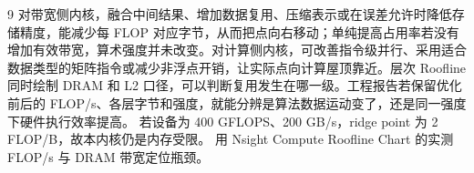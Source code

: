 \begin{solutionexercise}{9}
对带宽侧内核，融合中间结果、增加数据复用、压缩表示或在误差允许时降低存储精度，能减少每 FLOP 对应字节，从而把点向右移动；单纯提高占用率若没有增加有效带宽，算术强度并未改变。对计算侧内核，可改善指令级并行、采用适合数据类型的矩阵指令或减少非浮点开销，让实际点向计算屋顶靠近。层次 Roofline 同时绘制 DRAM 和 L2 口径，可以判断复用发生在哪一级。工程报告若保留优化前后的 FLOP/s、各层字节和强度，就能分辨是算法数据运动变了，还是同一强度下硬件执行效率提高。
\variantheading 若设备为 400 GFLOPS、200 GB/s，ridge point 为 2 FLOP/B，故本内核仍是内存受限。
\practiceheading 用 Nsight Compute Roofline Chart 的实测 FLOP/s 与 DRAM 带宽定位瓶颈。
\end{solutionexercise}

